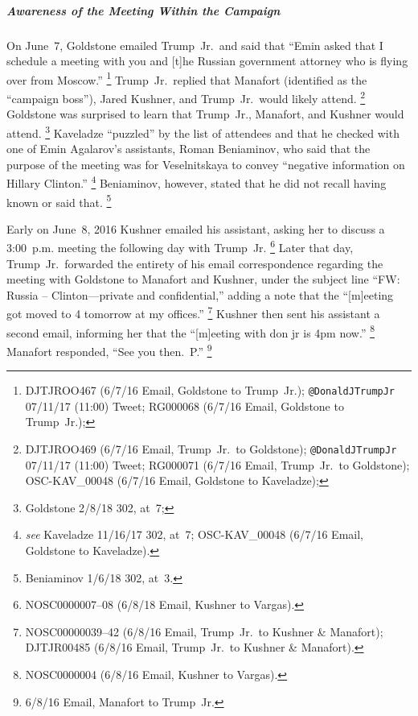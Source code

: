 \subparagraph{Awareness of the Meeting Within the Campaign}

On June~7, Goldstone emailed Trump~Jr.\ and said that ``Emin asked that I schedule a meeting with you and [t]he Russian government attorney who is flying over from Moscow.''%
\footnote{DJTJROO467 (6/7/16 Email, Goldstone to Trump~Jr.);
\verb+@DonaldJTrumpJr+ 07/11/17 (11:00) Tweet;
RG000068 (6/7/16 Email, Goldstone to Trump~Jr.);
}
Trump~Jr.\ replied that Manafort (identified as the ``campaign boss''), Jared Kushner, and Trump~Jr.\ would likely attend.%
\footnote{DJTJROO469 (6/7/16 Email, Trump~Jr.\ to Goldstone);
\verb+@DonaldJTrumpJr+ 07/11/17 (11:00) Tweet;
RG000071 (6/7/16 Email, Trump~Jr.\ to Goldstone);
OSC-KAV\_00048 (6/7/16 Email, Goldstone to Kaveladze);
}
Goldstone was surprised to learn that Trump~Jr., Manafort, and Kushner would attend.%
\footnote{Goldstone 2/8/18 302, at~7;
}
Kaveladze 
``puzzled'' by the list of attendees and that he checked with one of Emin Agalarov's assistants, Roman Beniaminov, who said that the purpose of the meeting was for Veselnitskaya to convey ``negative information on Hillary Clinton.''%
\footnote{ \textit{see} Kaveladze 11/16/17 302, at~7;
OSC-KAV\_00048 (6/7/16 Email, Goldstone to Kaveladze).}
Beniaminov, however, stated that he did not recall having known or said that.%
\footnote{Beniaminov 1/6/18 302, at~3.}

Early on June~8, 2016 Kushner emailed his assistant, asking her to discuss a 3:00~p.m. meeting the following day with Trump~Jr.%
\footnote{NOSC0000007--08 (6/8/18 Email, Kushner to Vargas).}
Later that day, Trump~Jr.\ forwarded the entirety of his email correspondence regarding the meeting with Goldstone to Manafort and Kushner, under the subject line ``FW: Russia -- Clinton---private and confidential,'' adding a note that the ``[m]eeting got moved to 4 tomorrow at my offices.''%
\footnote{NOSC00000039--42 (6/8/16 Email, Trump~Jr.\ to Kushner \& Manafort);
DJTJR00485 (6/8/16 Email, Trump~Jr.\ to Kushner \& Manafort).}
Kushner then sent his assistant a second email, informing her that the ``[m]eeting with don jr is 4pm now.''%
\footnote{NOSC0000004 (6/8/16 Email, Kushner to Vargas).}
Manafort responded, ``See you then.~P.''%
\footnote{6/8/16 Email, Manafort to Trump~Jr.}

